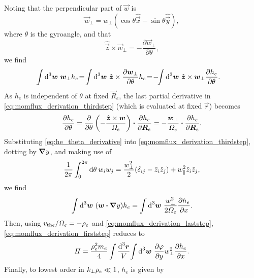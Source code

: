 \documentclass{jpp}
\newcommand{\phinorm}{\varphi}
\begin{document}
Noting that the perpendicular part of \(\vec{w}\) is
\begin{equation}
	\vec{w}_\perp = w_\perp (\cos\theta \hat{\vec{x}} - \sin\theta \hat{\vec{y}}),
\end{equation}
where \(\theta\) is the gyroangle, and that
\begin{equation}
 	\hat{\vec{z}} \times \vec{w}_\perp = -\frac{\partial \vec{w}_\perp}{\partial \theta},
\end{equation}
we find
\begin{align}
	&{\int \text{d}^{3} \boldsymbol{w} \ } \boldsymbol{w}_\perp h_e\!= \! {\int \text{d}^{3} \boldsymbol{w} \ } \hat{\boldsymbol{z}}\times \frac{\partial \boldsymbol{w}_\perp}{\partial \theta} h_e\!=\!-\!{\int \text{d}^{3} \boldsymbol{w} \ } \hat{\boldsymbol{z}}\times\boldsymbol{w}_\perp \frac{\partial h_e}{\partial \theta}.
	\label{eq:momflux_derivation_thirdstep}
\end{align}
As \(h_e\) is independent of \(\theta\) at fixed \(\vec{R}_e\), the last partial derivative in \cref{eq:momflux_derivation_thirdstep} (which is evaluated at fixed \(\vec{r}\)) becomes
\begin{equation}
	\frac{\partial h_e}{\partial \theta} = \frac{\partial}{\partial\theta}\left(-\frac{\hat{\boldsymbol{z}}\times\boldsymbol{w}}{\varOmega_e}\right) \boldsymbol{\cdot} \frac{\partial h_e}{\partial \boldsymbol{R}_e} = - \frac{\boldsymbol{w}_\perp}{\varOmega_e}\boldsymbol{\cdot} \frac{\partial h_e}{\partial \boldsymbol{R}_e}.
	\label{eq:he_theta_derivative}
\end{equation}
Substituting \cref{eq:he_theta_derivative} into \cref{eq:momflux_derivation_thirdstep}, dotting by \({\boldsymbol{\nabla}} y\), and making use of
\begin{equation}
	\frac{1}{2\pi}\int_0^{2\pi} \text{d} \theta \: w_i w_j = \frac{w_\perp^2}{2}(\delta_{ij} - \hat{z}_i\hat{z}_j) + w_\parallel^2 \hat{z}_i\hat{z}_j,
\end{equation}
we find
\begin{equation}
	{\int \text{d}^{3} \boldsymbol{w} \ } (\boldsymbol{w} \boldsymbol{\cdot} {\boldsymbol{\nabla}} y) h_e = {\int \text{d}^{3} \boldsymbol{w} \ } \frac{w_\perp^2}{2\varOmega_e} \frac{\partial h_e}{\partial x}.
	\label{eq:momflux_derivation_laststep}
\end{equation}
Then, using \(v_{\text{th}e}/\varOmega_e = -\rho_e\) and \cref{eq:momflux_derivation_laststep}, \cref{eq:momflux_derivation_firststep} reduces to
\begin{align}
	\Pi = \frac{\rhoe^2m_e}{4} \int \frac{\rmd^3 \vec{r}}{V} \intw \frac{\partial \phinorm}{\partial y} w_\perp^2 \frac{\partial h_e}{\partial x}.
	\label{eq:momflux_derivation_laststep_butreallyitsthelastonethistime}
\end{align}
Finally, to lowest order in \(k_\perp \rho_e \ll 1\), \(h_e\) is given by \citep{adkins23}
\end{document}
